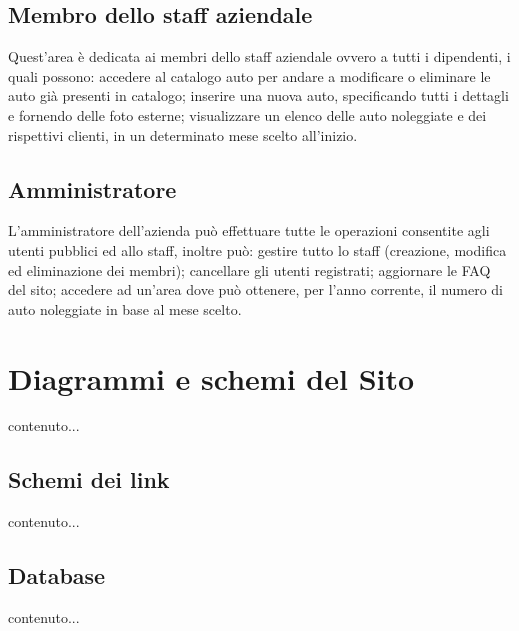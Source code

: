 \documentclass[12pt,a4paperS]{report}
\begin{document}
\begin{normalsize}
			\section{Membro dello staff aziendale}
				Quest'area è dedicata ai membri dello staff aziendale ovvero a tutti i dipendenti, i quali possono: accedere al catalogo auto per andare a modificare o eliminare le auto già presenti in catalogo; inserire una nuova auto, specificando tutti i dettagli e fornendo delle foto esterne; visualizzare un elenco delle auto noleggiate e dei rispettivi clienti, in un determinato mese scelto all'inizio.
			
			\section{Amministratore}
				L'amministratore dell'azienda può effettuare tutte le operazioni consentite agli utenti pubblici ed allo staff, inoltre può: gestire tutto lo staff (creazione, modifica ed eliminazione dei membri); cancellare gli utenti registrati; aggiornare le FAQ del sito; accedere ad un'area dove può ottenere, per l'anno corrente, il numero di auto noleggiate in base al mese scelto.
		\end{normalsize}
		
	\hypertarget{diagrammi}{\chapter{Diagrammi e schemi del Sito}}
	\label{diagrammi}
		\begin{normalsize}
			contenuto...
			\section{Schemi dei link}
				contenuto...
				
			\section{Database}
				contenuto...
		\end{normalsize}
		
\end{document}
